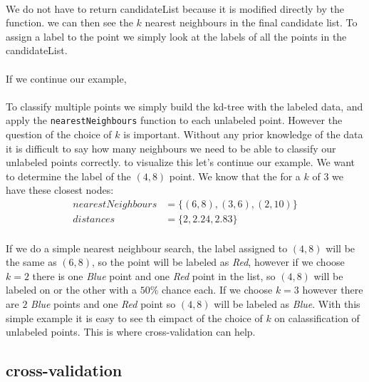 \documentclass[11 pt]{article}
\begin{document}
\paragraph{}We do not have to return candidateList because it is modified directly by the function. we can then see the $k$ nearest neighbours in the final candidate list. To assign a label to the point we simply look at the labels of all the points in the candidateList.
\paragraph{}If we continue our example,


\paragraph{}To classify multiple points we simply build the kd-tree with the labeled data, and apply the \texttt{nearestNeighbours} function to each unlabeled point. However the question of the choice of $k$ is important. Without any prior knowledge of the data it is difficult to say how many neighbours we need to be able to classify our unlabeled points correctly. to visualize this let's continue our example. We want to determine the label of the $(4,8)$ point. We know that the for a $k$ of $3$ we have these closest nodes:
\begin{align*}
  nearestNeighbours &= \{(6,8),(3,6),(2,10)\}\\
  distances &= \{2, 2.24, 2.83\}
\end{align*}
\paragraph{}If we do a simple nearest neighbour search, the label assigned to $(4,8)$ will be the same as $(6,8)$, so the point will be labeled as \emph{Red}, however if we choose $k=2$ there is one \emph{Blue} point and one \emph{Red} point in the  list, so $(4,8)$ will be labeled on or the other with a $50\%$ chance each. If we choose $k=3$ however there are $2$ \emph{Blue} points and one \emph{Red} point so $(4,8)$ will be labeled as \emph{Blue}. With this simple example it is easy to see th eimpact of the choice of $k$ on calassification of unlabeled points. This is where cross-validation can help.

\subsection{cross-validation}
\end{document}
